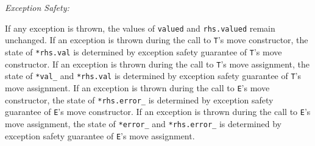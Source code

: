 \documentclass[a4paper,10pt]{article}
\newcommand{\cpp}[1]{\lstinline{#1}}
\newcommand{\wordingItem}[1]{\noindent\textit{#1:}}
\newenvironment{wordingTextItem}[1]{\wordingItem{#1}\vspace{7pt}\noindent\begin{adjustwidth}{12pt}{}}{\vspace{7pt}\end{adjustwidth}}
\newenvironment{wordingPara}{\begin{adjustwidth}{12pt}{}}{\end{adjustwidth}}
\begin{document}
\begin{wordingPara}
\begin{wordingTextItem}{Exception Safety}
If any exception is thrown, the values of \cpp{valued} and \cpp{rhs.valued} remain unchanged. If an exception is thrown during the call to \cpp{T}'s move constructor, the state of \cpp{*rhs.val} is determined by exception safety guarantee of \cpp{T}'s move constructor. If an exception is thrown during the call to \cpp{T}'s move assignment, the state of \cpp{*val_} and \cpp{*rhs.val} is determined by exception safety guarantee of \cpp{T}'s move assignment. If an exception is thrown during the call to \cpp{E}'s move constructor, the state of \cpp{*rhs.error_} is determined by exception safety guarantee of \cpp{E}'s move constructor. If an exception is thrown during the call to \cpp{E}'s move assignment, the state of \cpp{*error_} and \cpp{*rhs.error_} is determined by exception safety guarantee of \cpp{E}'s move assignment.
\end{wordingTextItem}
\end{wordingPara}
\end{document}
